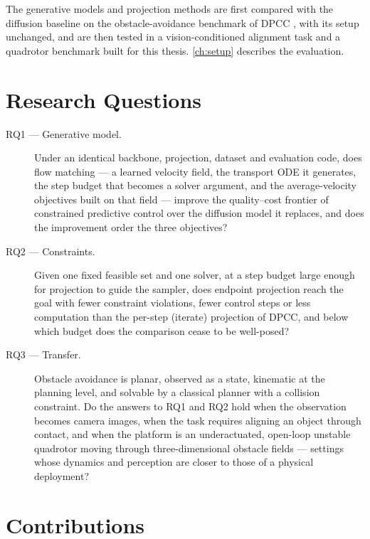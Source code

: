 The generative models and projection methods are first compared with the diffusion baseline on the
obstacle-avoidance benchmark of \ac{DPCC} \parencite{romer2025diffusion,jia2024towards}, with its
setup unchanged, and are then tested in a vision-conditioned alignment task and a quadrotor benchmark
built for this thesis. \autoref{ch:setup} describes the evaluation.

\section{Research Questions}\label{sec:intro:rqs}

\begin{description}
  \item[RQ1 --- Generative model.] Under an identical backbone, projection, dataset and evaluation
    code, does flow matching --- a learned velocity field, the transport \ac{ODE} it generates, the
    step budget that becomes a solver argument, and the average-velocity objectives built on that
    field --- improve the quality--cost frontier of constrained predictive control over the diffusion
    model it replaces, and does the improvement order the three objectives?
  \item[RQ2 --- Constraints.] Given one fixed feasible set and one solver, at a step budget large
    enough for projection to guide the sampler, does endpoint projection reach the goal with fewer
    constraint violations, fewer control steps or less computation than the per-step (iterate)
    projection of \ac{DPCC}, and below which budget does the comparison cease to be well-posed?
  \item[RQ3 --- Transfer.] Obstacle avoidance is planar, observed as a state, kinematic at the
    planning level, and solvable by a classical planner with a collision constraint. Do the answers
    to RQ1 and RQ2 hold when the observation becomes camera images, when the task requires aligning
    an object through contact, and when the platform is an underactuated, open-loop unstable
    quadrotor moving through three-dimensional obstacle fields --- settings whose dynamics and
    perception are closer to those of a physical deployment?
\end{description}


\section{Contributions}\label{sec:intro:contributions}

